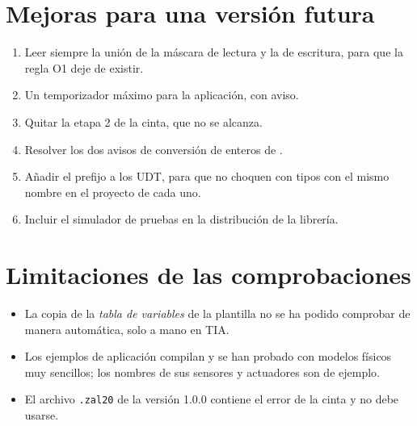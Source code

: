 \section{Mejoras para una versión futura}
\begin{enumerate}
\item Leer siempre la unión de la máscara de lectura y la de escritura, para que la regla O1 deje de existir.
\item Un temporizador máximo para la aplicación, con aviso.
\item Quitar la etapa 2 de la cinta, que no se alcanza.
\item Resolver los dos avisos de conversión de enteros de .
\item Añadir el prefijo  a los UDT, para que no choquen con tipos con el mismo nombre en el proyecto de cada uno.
\item Incluir el simulador de pruebas en la distribución de la librería.
\end{enumerate}

\section{Limitaciones de las comprobaciones}
\begin{itemize}
\item La copia de la \emph{tabla de variables} de la plantilla no se ha podido comprobar de manera automática, solo a mano en TIA.
\item Los ejemplos de aplicación compilan y se han probado con modelos físicos muy sencillos; los nombres de sus sensores y actuadores son de ejemplo.
\item El archivo \texttt{.zal20} de la versión 1.0.0 contiene el error de la cinta y no debe usarse.
\end{itemize}
